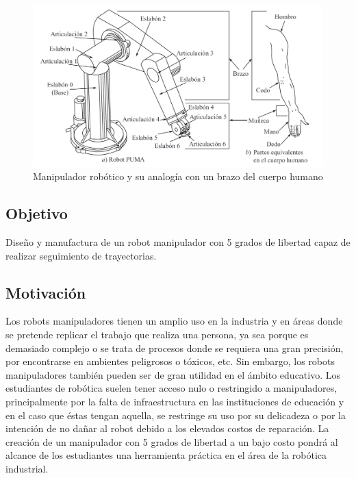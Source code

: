 \begin{figure}[h!]
	\centering
	\includegraphics[scale=0.45]{Capitulo1/figs/EstructuraManipulador.png} 
	\caption{Manipulador robótico y su analogía con un brazo del cuerpo humano}
	\label{estructurarobot}
\end{figure}




\subsection{Objetivo}

Diseño y manufactura de un robot manipulador con 5 grados de libertad capaz de realizar seguimiento de trayectorias.
\subsection{Motivación}

Los robots manipuladores tienen un amplio uso en la industria y en áreas donde se pretende replicar el trabajo que realiza una persona, ya sea porque es demasiado complejo o se trata de procesos donde se requiera una gran precisión, por encontrarse en ambientes peligrosos o tóxicos, etc. Sin embargo, los robots manipuladores también pueden ser de gran utilidad en el ámbito educativo. Los estudiantes de robótica suelen tener acceso nulo o restringido a manipuladores, principalmente por la falta de infraestructura en las instituciones de educación y en el caso que éstas tengan aquella, se restringe su uso por su delicadeza o por la intención de no dañar al robot debido a los elevados costos de reparación. La creación de un manipulador con 5 grados de libertad a un bajo costo pondrá al alcance de los estudiantes una herramienta práctica en el área de la robótica industrial.

